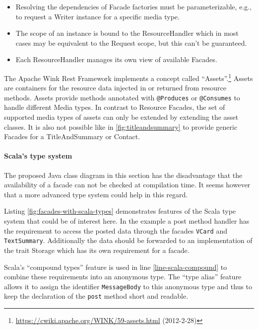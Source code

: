 \documentclass[11pt,a4paper,headsepline,twoside]{scrartcl}		%
\newcommand{\citeurl}[2]{\url{#1} (#2)}
\begin{document}
\begin{itemize}
\item Resolving the dependencies of Facade factories must be parameterizable,
  e.g., to request a Writer instance for a specific media type.
\item The scope of an instance is bound to the ResourceHandler which in most
  cases may be equivalent to the Request scope, but this can't be guaranteed.
\item Each ResourceHandler manages its own view of available Facades.
\end{itemize}

The Apache Wink Rest Framework implements a concept called
``Assets''.\footnote{\citeurl{https://cwiki.apache.org/WINK/59-assets.html}{2012-2-28}}
Assets are containers for the resource data injected in or returned from
resource methods. Assets provide methods annotated with \lstinline:@Produces: or
\lstinline:@Consumes: to handle different Media types. In contrast to Resource
Facades, the set of supported media types of assets can only be extended by
extending the asset classes. It is also not possible like in
\autoref{fig:titleandsummary} to provide generic Facades for a TitleAndSummary
or Contact.

\paragraph{Scala's type system}


The proposed Java class diagram in this section has the disadvantage that the
availability of a facade can not be checked at compilation time. It seems
however that a more advanced type system could help in this regard.

Listing \ref{fig:facades-with-scala-types} demonstrates features of the Scala
type system \cite{Odersky2011} that could be of interest here. In the example a
post method handler has the requirement to access the posted data through the
facades \lstinline:VCard: and \lstinline:TextSummary:. Additionally the data
should be forwarded to an implementation of the trait Storage which has its own
requirement for a facade.

Scala's ``compound types'' feature is used in line \ref{line-scala-compound} to
combine these requirements into an anonymous type. The ``type alias'' feature
allows it to assign the identifier \lstinline:MessageBody: to this anonymous
type and thus to keep the declaration of the \lstinline:post: method short and
readable.
\end{document}
